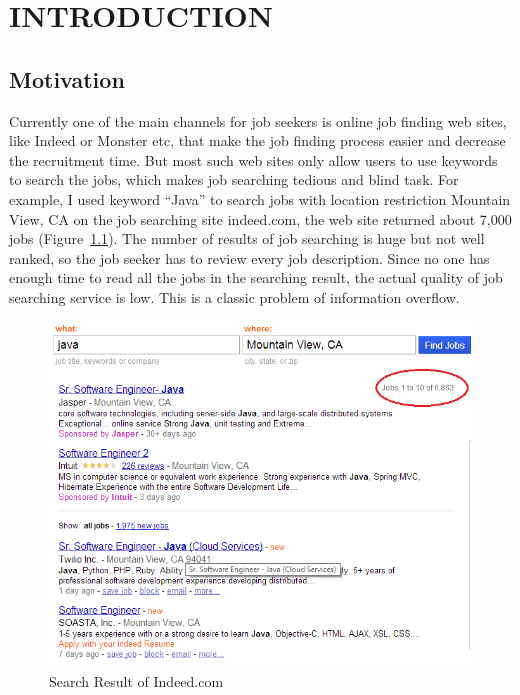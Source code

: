 \chapter{INTRODUCTION}




\section{Motivation}
Currently one of the main channels for job seekers is online job finding web sites, like Indeed or  Monster etc, that make the job finding process easier and decrease the recruitment time. But most such web sites only allow users to use keywords to search the jobs, which makes job searching tedious and blind task. For example, I used keyword ``Java'' to search jobs with location restriction Mountain View, CA on the job searching site indeed.com, the web site returned about 7,000 jobs (Figure~\ref{fig:Indeed}). The number of results of job searching is huge but not well ranked, so the job seeker has to review every job description. Since no one has enough time to read all the jobs in the searching result, the actual quality of job searching service is low. This is a classic problem of information overflow.


\begin{figure}[htbp]
  \centering
  \includegraphics[scale=0.6]{images/indeed1.png}
  \caption{Search Result of Indeed.com}
  \label{fig:Indeed}
\end{figure}

